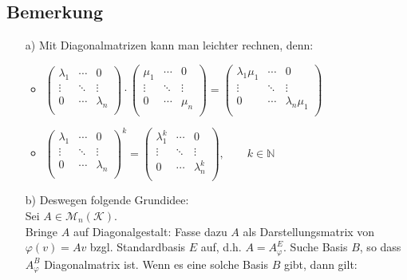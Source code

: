 \documentclass[12pt,titlepage, pdf]{article}
\newcommand{\N}{\mathds{N}}
\newcommand{\K}{\mathcal{K}}
\newcommand{\M}{\mathcal{M}}
\renewcommand{\>}{\rightarrow}
\renewcommand{\*}{\cdot}
\renewcommand{\phi}{\varphi}
\begin{document}
\subsection{Bemerkung}
\begin{itemize}
	\item[a)] Mit Diagonalmatrizen kann man leichter rechnen, denn:
	\begin{itemize}
		\item $\begin{pmatrix}
		\lambda_1 & \cdots & 0 \\
		\vdots & \ddots & \vdots \\
		0 & \cdots & \lambda_n \\
		\end{pmatrix} \cdot \begin{pmatrix}
		\mu_1 & \cdots & 0 \\
		\vdots & \ddots & \vdots \\
		0 & \cdots & \mu_n \\
		\end{pmatrix} = \begin{pmatrix}
		\lambda_1\mu_1 & \cdots & 0 \\
		\vdots & \ddots & \vdots \\
		0 & \cdots & \lambda_n\mu_1 \\
		\end{pmatrix}$
		\item $\begin{pmatrix}
		\lambda_1 & \cdots & 0 \\
		\vdots & \ddots & \vdots \\
		0 & \cdots & \lambda_n \\
		\end{pmatrix}^k = \begin{pmatrix}
		\lambda_1^k & \cdots & 0 \\
		\vdots & \ddots & \vdots \\
		0 & \cdots & \lambda_n^k \\
		\end{pmatrix}, \qquad k \in \N$
	\end{itemize}
	\item[b)]
	Deswegen folgende Grundidee:\\
	Sei $A \in \M_n(\K)$.\\
	 Bringe $A$ auf Diagonalgestalt: Fasse dazu $A$ als Darstellungsmatrix von $\phi(v) = Av$ bzgl. Standardbasis $E$ auf, d.h. $A = A_\phi^E$. Suche Basis $B$, so dass $A_\phi^B$ Diagonalmatrix ist. Wenn es eine solche Basis $B$ gibt, dann gilt:
\end{itemize}
\end{document}
